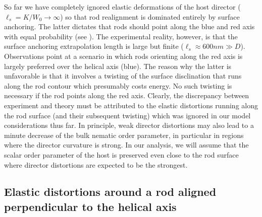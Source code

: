 So far we have completely ignored elastic deformations of the host director ($\ell_{s} = K/W_{0} \rightarrow \infty$) so that rod realignment is dominated entirely by surface anchoring. The latter dictates that rods should point along the blue and red axis with equal probability (see ). The experimental reality, however, is that the surface anchoring extrapolation length is large but finite ($\ell_{s} \approx 600 nm \gg D$). Observations point at a scenario in which  rods  orienting along the red axis is largely preferred over the helical axis (blue). The reason why the latter is unfavorable  is that it involves a twisting of the surface disclination that runs along the rod contour which presumably costs energy. No such twisting is necessary if the rod points along the red axis.     Clearly, the discrepancy between experiment and theory must be attributed to the  elastic distortions running along the rod surface (and their subsequent twisting) which was ignored in our model considerations thus far. In principle, weak director distortions may also lead to a minute decrease  of the bulk nematic order parameter,  in particular in regions where the director curvature is strong.  In our analysis, we will assume that the scalar order parameter of the host is preserved even close to the rod surface where director distortions are expected to be the strongest.

\subsection{Elastic distortions around a rod aligned perpendicular to the helical axis}

